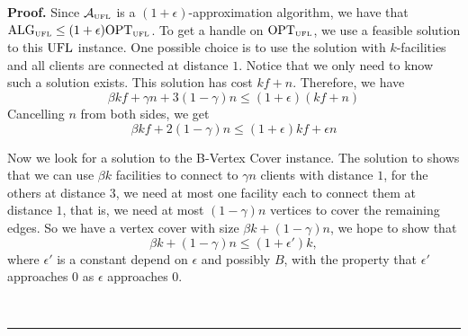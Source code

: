 \documentclass[oneside,final]{ucr}
\newenvironment{proof}[1][Proof]{\textbf{#1.} }{\ \rule{0.5em}{0.5em}}
\begin{document}
\begin{proof}
  Since $\calA_{\smallUFL}$ is a $(1+\epsilon)$-approximation algorithm, we
  have that $\mbox{\rm ALG}_{\mbox{\tiny\rm UFL}} \leq (1+\epsilon) \mbox{\rm OPT}_{\mbox{\tiny\rm UFL}}$. To get a handle on
  $\mbox{\rm OPT}_{\mbox{\tiny\rm UFL}}$, we use a feasible solution to this $\mbox{\rm UFL}$
  instance. One possible choice is to use the solution with
  $k$-facilities and all clients are connected at distance $1$. Notice
  that we only need to know such a solution exists. This solution has
  cost $kf + n$. Therefore, we have
  \begin{equation*}
    \beta k f + \gamma n + 3 (1 - \gamma) n \leq (1 + \epsilon) (kf + n)
  \end{equation*}
  Cancelling $n$ from both sides, we get
  \begin{equation}
    \label{eq:APX:UFL}
    \beta k f + 2(1-\gamma) n \leq (1+\epsilon)kf + \epsilon n
  \end{equation}

  Now we look for a solution to the B-Vertex Cover instance. The
  solution to {\UFL} shows that we can use $\beta k$ facilities to
  connect to $\gamma n$ clients with distance $1$, for the others at
  distance $3$, we need at most one facility each to connect them at
  distance $1$, that is, we need at most $(1-\gamma)n$ vertices to
  cover the remaining edges. So we have a vertex cover with size
  $\beta k + (1 - \gamma) n$, we hope to show that
  \begin{equation}
    \label{eq:APX:BVC}
    \beta k + (1 - \gamma) n \leq (1 + \epsilon') k,
  \end{equation}
  where $\epsilon'$ is a constant depend on $\epsilon$ and possibly
  $B$, with the property that $\epsilon'$ approaches $0$ as $\epsilon$
  approaches $0$.


\end{proof}
\end{document}

